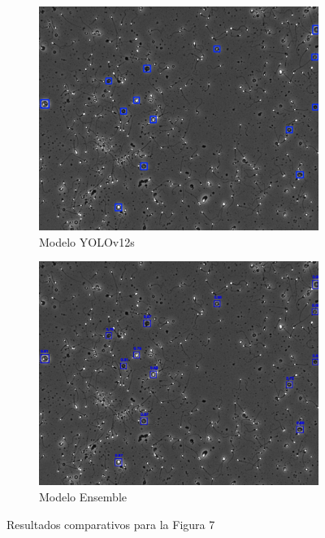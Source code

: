 \documentclass[12pt,a4paper,onecolumn,oneside]{report}
\begin{document}
\begin{figure}[H]
  \vspace{0.3cm} 
  
  \begin{subfigure}[b]{0.48\textwidth}
    \centering
    \includegraphics[width=\textwidth]{figuras/evaluacion_cualitativa/7/7_v12.jpg}
    \caption{Modelo YOLOv12s}
    \label{fig:yolov12s_image_7}
  \end{subfigure}
  \hfill
  \begin{subfigure}[b]{0.48\textwidth}
    \centering
    \includegraphics[width=\textwidth]{figuras/evaluacion_cualitativa/7/7_ensemble.jpg}
    \caption{Modelo Ensemble}
    \label{fig:ensemble_image_7}
  \end{subfigure}
  
  \caption{Resultados comparativos para la Figura 7}
  \label{fig:7}
\end{figure}
\end{document}
